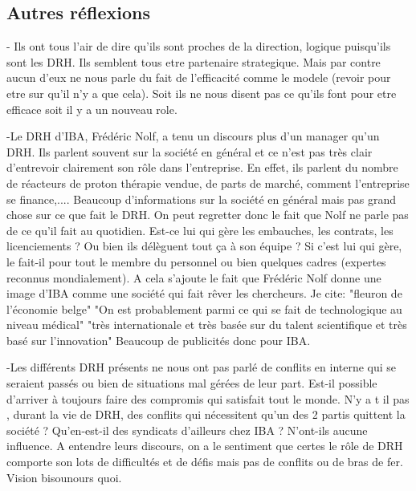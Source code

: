 \subsection{Autres réflexions}

- Ils ont tous l'air de dire qu'ils sont proches de la direction, logique puisqu'ils sont les DRH. Ils semblent tous etre partenaire strategique. Mais par contre aucun d'eux ne nous parle du fait de l'efficacité comme le modele (revoir pour etre sur qu'il n'y a que cela). Soit ils ne nous disent pas ce qu'ils font pour etre efficace soit il y a un nouveau role. 


-Le DRH d'IBA, Frédéric Nolf, a tenu un discours plus d'un manager qu'un DRH. Ils parlent souvent sur la société en général et ce n'est pas très clair d'entrevoir clairement son rôle dans l'entreprise. En effet, ils parlent du nombre de réacteurs de proton thérapie vendue, de parts de marché, comment l'entreprise se finance,.... Beaucoup d'informations sur la société en général mais pas grand chose sur ce que fait le DRH. On peut regretter donc le fait que Nolf ne parle pas de ce qu'il fait au quotidien. Est-ce lui qui gère les embauches, les contrats, les licenciements ? Ou bien ils délèguent tout ça à son équipe ? Si c'est lui qui gère, le fait-il pour tout le membre du personnel ou bien quelques cadres (expertes reconnus mondialement). 
 A cela s'ajoute le fait que Frédéric Nolf donne une image d'IBA comme une société qui fait rêver les chercheurs.
 Je cite:
 "fleuron de l'économie belge"
 "On est probablement parmi ce qui se fait de technologique au niveau médical"
 "très internationale  et très basée sur du talent scientifique et très basé sur l'innovation"
 Beaucoup de publicités donc pour IBA.
 
 
 
-Les différents DRH présents ne nous ont pas parlé de conflits en interne qui se seraient passés ou bien de situations mal gérées de leur part. Est-il possible d'arriver à toujours faire des compromis qui satisfait tout le monde. N'y a t il pas , durant la vie de DRH, des conflits qui nécessitent qu'un des 2 partis quittent la société ? Qu'en-est-il des syndicats d'ailleurs chez IBA ? N'ont-ils aucune influence. A entendre leurs discours, on a le sentiment que certes le rôle de DRH comporte son lots de difficultés et de défis mais pas de conflits ou de bras de fer. Vision bisounours quoi.
